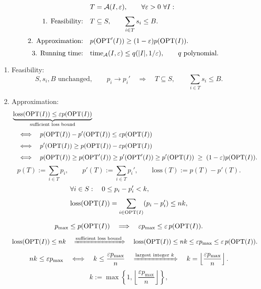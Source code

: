 \documentclass[12pt,a4paper]{article}
\begin{document}
\begin{remark}
\label{rem:fptas-rounding}
\[
\begin{aligned}
&T=\mathcal A(I,\varepsilon),\qquad\forall\varepsilon>0\ \forall I:\\[3pt]
\text{1. Feasibility:}\quad&T\subseteq S,\qquad\sum_{i\in T}s_i\leq B.\\[3pt]
\text{2. Approximation:}\quad&p(\operatorname{OPT}'(I))\geq(1-\varepsilon)p(\operatorname{OPT}(I)).\\[3pt]
\text{3. Running time:}\quad&\mathrm{time}_{\mathcal A}(I,\varepsilon)
\leq q(|I|,1/\varepsilon),\qquad q\text{ polynomial}.
\end{aligned}
\]
\begin{enumerate}
\item Feasibility:
\[
S,s_i,B\text{ unchanged},\qquad p_i\to p_i'
\quad\Longrightarrow\quad
T\subseteq S,\qquad\sum_{i\in T}s_i\leq B.
\]
\item Approximation:
\[
\begin{aligned}
&\underbrace{\mathrm{loss}(\operatorname{OPT}(I))\leq\varepsilon p(\operatorname{OPT}(I))}_{\text{sufficient loss bound}}\\[3pt]
&\quad\Longleftrightarrow\quad
p(\operatorname{OPT}(I))-p'(\operatorname{OPT}(I))\leq\varepsilon p(\operatorname{OPT}(I))\\[3pt]
&\quad\Longleftrightarrow\quad
p'(\operatorname{OPT}(I))\geq p(\operatorname{OPT}(I))-\varepsilon p(\operatorname{OPT}(I))\\[3pt]
&\quad\Longleftrightarrow\quad
p(\operatorname{OPT}(I))\geq p(\operatorname{OPT}'(I))\geq p'(\operatorname{OPT}'(I))\geq p'(\operatorname{OPT}(I))\;\geq\;(1-\varepsilon)p(\operatorname{OPT}(I)).
\end{aligned}
\]
\[
p(T):=\sum_{i\in T}p_i,\qquad
p'(T):=\sum_{i\in T}p_i',\qquad
\mathrm{loss}(T):=p(T)-p'(T).
\]
\[
\begin{aligned}
&\forall i\in S:\quad 0\leq p_i-p_i'<k,\\[3pt]
&\mathrm{loss}(\operatorname{OPT}(I))
=\sum_{i\in\operatorname{OPT}(I)}(p_i-p_i')\leq nk,\\[3pt]
\end{aligned}
\]
\[
p_{\max}\leq p(\operatorname{OPT}(I))
\quad\Longrightarrow\quad
\varepsilon p_{\max}\leq\varepsilon\,p(\operatorname{OPT}(I)).
\]
\[
\mathrm{loss}(\operatorname{OPT}(I))\leq nk
\quad\xRightarrow{\text{sufficient loss bound}}\quad
\mathrm{loss}(\operatorname{OPT}(I))\leq nk\leq\varepsilon p_{\max}
\leq\varepsilon\,p(\operatorname{OPT}(I)).
\]
\[
nk\leq\varepsilon p_{\max}
\quad\Longleftrightarrow\quad
k\leq\frac{\varepsilon p_{\max}}n
\quad\xRightarrow{\text{largest integer }k}\quad
k=\left\lfloor\frac{\varepsilon p_{\max}}n\right\rfloor.
\]
\[
k:=\max\left\{1,\left\lfloor\frac{\varepsilon p_{\max}}n\right\rfloor\right\},
\]
\end{enumerate}
\end{remark}
\end{document}
